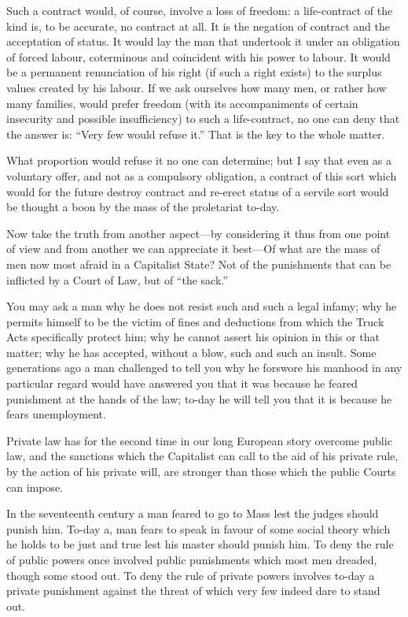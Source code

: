 \documentclass{book}
\begin{document}
Such a contract would, of course, involve a loss of freedom: a life-contract of the kind is, to be accurate, no contract at all. It is the negation of contract and the acceptation of status. It would lay the man that undertook it under an obligation of forced labour, coterminous and coincident with his power to labour. It would be a permanent renunciation of his right (if such a right exists) to the surplus values created by his labour. If we ask ourselves how many men, or rather how many families, would prefer freedom (with its accompaniments of certain insecurity and possible insufficiency) to such a life-contract, no one can deny that the answer is: “Very few would refuse it.” That is the key to the whole matter.

What proportion would refuse it no one can determine; but I say that even as a voluntary offer, and not as a compulsory obligation, a contract of this sort which would for the future destroy contract and re-erect status of a servile sort would be thought a boon by the mass of the proletariat to-day.

Now take the truth from another aspect—by considering it thus from one point of view and from another we can appreciate it best—Of what are the mass of men now most afraid in a Capitalist State? Not of the punishments that can be inflicted by a Court of Law, but of “the sack.”

You may ask a man why he does not resist such and such a legal infamy; why he permits himself to be the victim of fines and deductions from which the Truck Acts specifically protect him; why he cannot assert his opinion in this or that matter; why he has accepted, without a blow, such and such an insult. Some generations ago a man challenged to tell you why he forswore his manhood in any particular regard would have answered you that it was because he feared punishment at the hands of the law; to-day he will tell you that it is because he fears unemployment.

Private law has for the second time in our long European story overcome public law, and the sanctions which the Capitalist can call to the aid of his private rule, by the action of his private will, are stronger than those which the public Courts can impose.

In the seventeenth century a man feared to go to Mass lest the judges should punish him. To-day a, man fears to speak in favour of some social theory which he holds to be just and true lest his master should punish him. To deny the rule of public powers once involved public punishments which most men dreaded, though some stood out. To deny the rule of private powers involves to-day a private punishment against the threat of which very few indeed dare to stand out.
\end{document}

